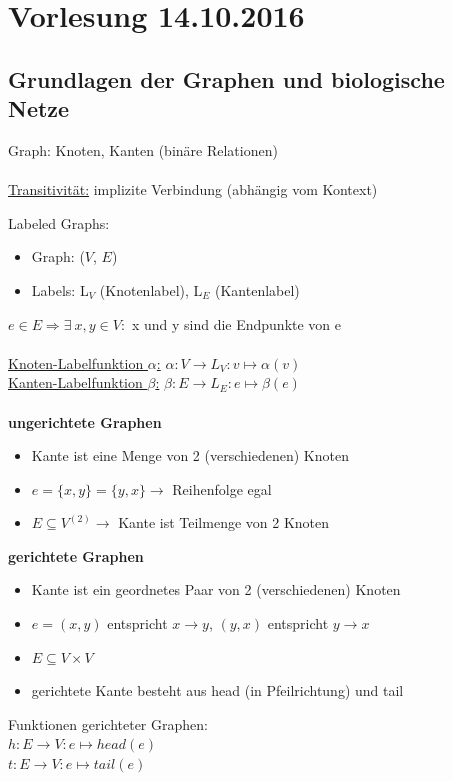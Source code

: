 \section{Vorlesung 14.10.2016}

\subsection{Grundlagen der Graphen und biologische Netze}
Graph: Knoten, Kanten (binäre Relationen)
\\\\
\underline{Transitivität:} implizite Verbindung (abhängig vom Kontext)

Labeled Graphs:
\begin{itemize}
	\item Graph: ($V$, $E$)
	\item Labels: L$_V$ (Knotenlabel), L$_E$ (Kantenlabel)
\end{itemize}

$e \in E \Rightarrow \exists \ x,y \in V:$ x und y sind die Endpunkte von e
\\\\
\underline{Knoten-Labelfunktion $\alpha$:} $\alpha:V \rightarrow L_V:v \mapsto \alpha(v)$\\
\underline{Kanten-Labelfunktion $\beta$:} $\beta:E \rightarrow L_E:e \mapsto \beta(e)$
\\\\
\textbf{ungerichtete Graphen}
\begin{itemize}
	\item Kante ist eine Menge von 2 (verschiedenen) Knoten
	\item $e = \{x,y\} = \{y,x\} \rightarrow$ Reihenfolge egal
	\item $E \subseteq V^{(2)} \rightarrow$ Kante ist Teilmenge von 2 Knoten
\end{itemize}

\textbf{gerichtete Graphen}
\begin{itemize}
	\item Kante ist ein geordnetes Paar von 2 (verschiedenen) Knoten
	\item $e = (x,y)$ entspricht $x \rightarrow y$, $(y,x)$ entspricht $y \rightarrow x$
	\item $E \subseteq V \times V$
	\item gerichtete Kante besteht aus head (in Pfeilrichtung) und tail
\end{itemize}

Funktionen gerichteter Graphen:\\
$h: E \rightarrow V: e \mapsto head(e)$\\
$t: E \rightarrow V: e \mapsto tail(e)$\\

